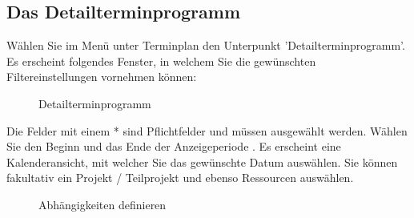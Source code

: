 \subsection{Das Detailterminprogramm}

Wählen Sie im Menü unter Terminplan den Unterpunkt 'Detailterminprogramm'. Es erscheint folgendes Fenster, in welchem Sie die gewünschten Filtereinstellungen vornehmen können:

\begin{figure}[H]
\caption{Detailterminprogramm}
\end{figure}

Die Felder mit einem * sind Pflichtfelder und müssen ausgewählt werden. Wählen Sie den Beginn und das Ende der Anzeigeperiode . Es erscheint eine Kalenderansicht, mit welcher Sie das gewünschte Datum auswählen. Sie können fakultativ ein Projekt / Teilprojekt  und ebenso Ressourcen  auswählen.

\begin{figure}[H]
\caption{Abhängigkeiten definieren}
\end{figure}



